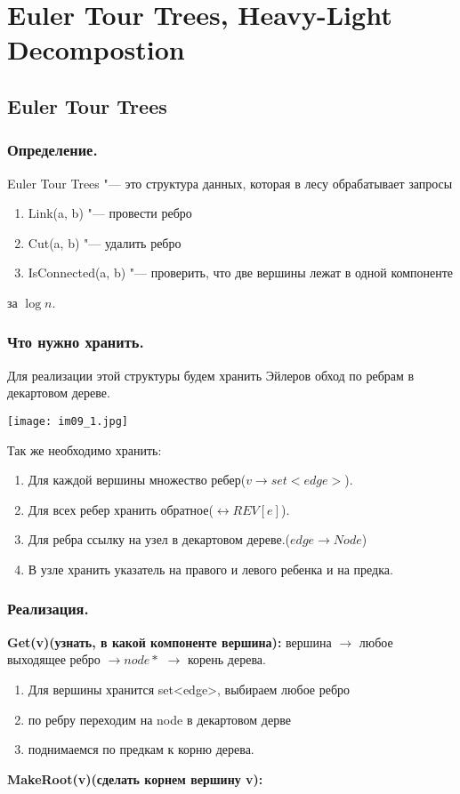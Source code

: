 ﻿\chapter{Euler Tour Trees, Heavy-Light Decompostion}

\section{Euler Tour Trees}
\subsection{Определение.}
Euler Tour Trees "--- это структура данных, которая в лесу обрабатывает запросы
\begin{enumerate}
\item Link(a, b) "--- провести ребро
\item Cut(a, b) "--- удалить ребро
\item IsConnected(a, b) "--- проверить, что две вершины лежат в одной компоненте
\end{enumerate}
за $\log n$.

\subsection{Что нужно хранить.}                                                                             

Для реализации этой структуры будем хранить Эйлеров обход по ребрам в декартовом дереве.

\begin{center} 
\texttt{[image: im09\_1.jpg]} 
\end{center}

Так же необходимо хранить:
\begin{enumerate}
\item Для каждой вершины множество ребер($v \to set<edge>$).
\item Для всех ребер хранить обратное($\leftrightarrow REV[e]$).
\item Для ребра ссылку на узел в декартовом дереве.($edge \to Node$)
\item В узле хранить указатель на правого и левого ребенка и на предка. 
\end{enumerate}

\subsection{Реализация.}
\textbf{Get(v)(узнать, в какой компоненте вершина):} вершина $\to$ любое выходящее ребро $\to node *$ $\to$ корень дерева.
\begin{enumerate}
\item Для вершины хранится set<edge>, выбираем любое ребро
\item по ребру переходим на node в декартовом дерве
\item поднимаемся по предкам к корню дерева. 
\end{enumerate}
\textbf{MakeRoot(v)(сделать корнем вершину v):}  


